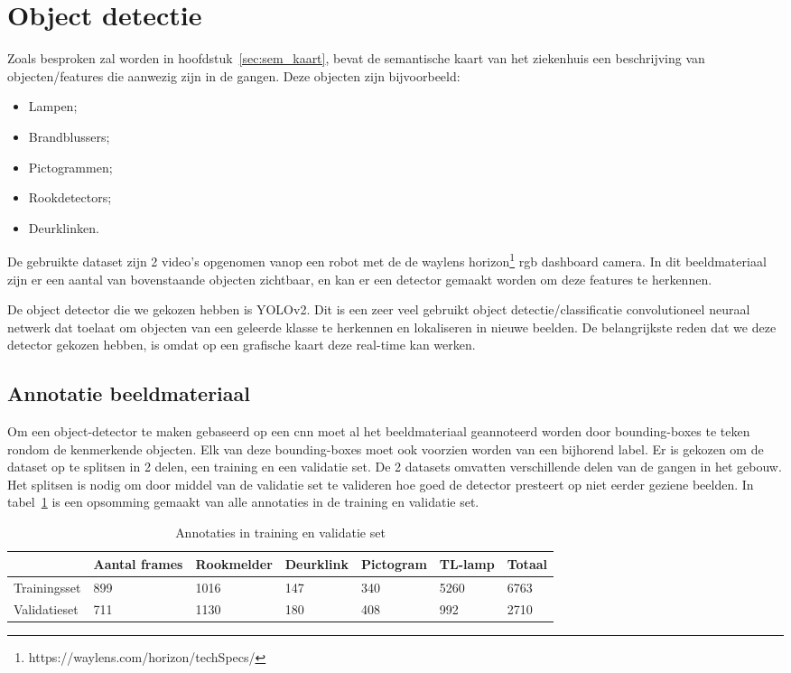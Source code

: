 \section{Object detectie}\label{sec:object_detectie}

Zoals besproken zal worden in hoofdstuk~\ref{sec:sem_kaart}, bevat de semantische kaart van het ziekenhuis een beschrijving van objecten/features die aanwezig zijn in de gangen.
Deze objecten zijn bijvoorbeeld:
\begin{itemize}
    \item Lampen;
    \item Brandblussers;
    \item Pictogrammen;
    \item Rookdetectors;
    \item Deurklinken.
\end{itemize}

De gebruikte dataset zijn 2 video's opgenomen vanop een robot met de de waylens horizon\footnote{https://waylens.com/horizon/techSpecs/} \gls{rgb} dashboard camera.
In dit beeldmateriaal zijn er een aantal van bovenstaande objecten zichtbaar, en kan er een detector gemaakt worden om deze features te herkennen.

De object detector die we gekozen hebben is YOLOv2\cite{yolov22016}.
Dit is een zeer veel gebruikt object detectie/classificatie convolutioneel neuraal netwerk dat toelaat om objecten van een geleerde klasse te herkennen en lokaliseren in nieuwe beelden.
De belangrijkste reden dat we deze detector gekozen hebben, is omdat op een grafische kaart deze real-time kan werken.


\subsection{Annotatie beeldmateriaal}
Om een object-detector te maken gebaseerd op een \gls{cnn} moet al het beeldmateriaal geannoteerd worden door bounding-boxes te teken rondom de kenmerkende objecten.
Elk van deze bounding-boxes moet ook voorzien worden van een bijhorend label.
Er is gekozen om de dataset op te splitsen in 2 delen, een training en een validatie set.
De 2 datasets omvatten verschillende delen van de gangen in het gebouw.
Het splitsen is nodig om door middel van de validatie set te valideren hoe goed de detector presteert op niet eerder geziene beelden.
In tabel~\ref{tab:annotaties} is een opsomming gemaakt van alle annotaties in de training en validatie set.

\begin{table}[h]
    \caption{Annotaties in training en validatie set}\label{tab:annotaties}
    \begin{tabular}{l | l | l | l | l | l | l}
        & Aantal frames & Rookmelder & Deurklink & Pictogram & TL-lamp & Totaal \\ \hline
        Trainingsset & 899 & 1016 & 147 & 340 & 5260 & 6763 \\
        Validatieset & 711 & 1130 & 180 & 408 & 992 & 2710 \\
    \end{tabular}
\end{table}

